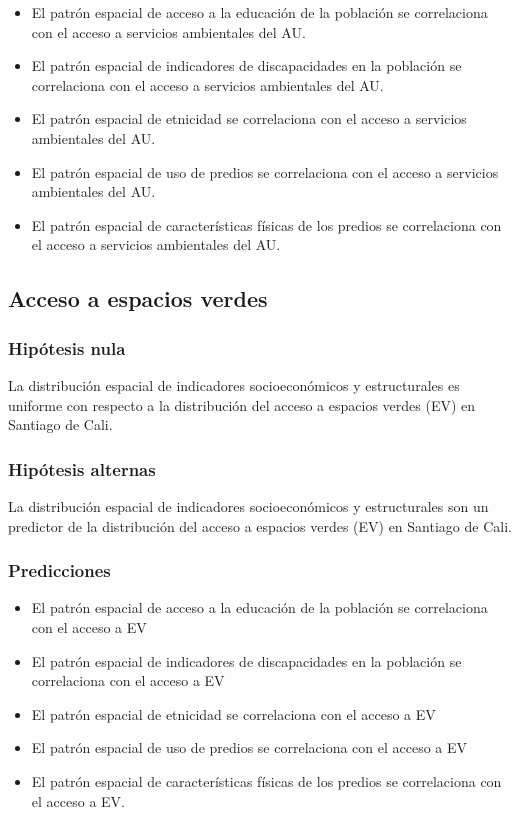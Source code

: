 \documentclass[12pt,]{book}
\providecommand{\tightlist}{%
  \setlength{\itemsep}{0pt}\setlength{\parskip}{0pt}}
\begin{document}
\begin{itemize}
\tightlist
\item
  El patrón espacial de acceso a la educación de la población se
  correlaciona con el acceso a servicios ambientales del AU.
\item
  El patrón espacial de indicadores de discapacidades en la población se
  correlaciona con el acceso a servicios ambientales del AU.
\item
  El patrón espacial de etnicidad se correlaciona con el acceso a
  servicios ambientales del AU.
\item
  El patrón espacial de uso de predios se correlaciona con el acceso a
  servicios ambientales del AU.
\item
  El patrón espacial de características físicas de los predios se
  correlaciona con el acceso a servicios ambientales del AU.
\end{itemize}

\subsection{Acceso a espacios verdes}\label{acceso-a-espacios-verdes}

\subsubsection{Hipótesis nula}\label{hipotesis-nula-1}

La distribución espacial de indicadores socioeconómicos y estructurales
es uniforme con respecto a la distribución del acceso a espacios verdes
(EV) en Santiago de Cali.

\subsubsection{Hipótesis alternas}\label{hipotesis-alternas-1}

La distribución espacial de indicadores socioeconómicos y estructurales
son un predictor de la distribución del acceso a espacios verdes (EV) en
Santiago de Cali.

\subsubsection{Predicciones}\label{predicciones-1}

\begin{itemize}
\tightlist
\item
  El patrón espacial de acceso a la educación de la población se
  correlaciona con el acceso a EV
\item
  El patrón espacial de indicadores de discapacidades en la población se
  correlaciona con el acceso a EV
\item
  El patrón espacial de etnicidad se correlaciona con el acceso a EV
\item
  El patrón espacial de uso de predios se correlaciona con el acceso a
  EV
\item
  El patrón espacial de características físicas de los predios se
  correlaciona con el acceso a EV.
\end{itemize}
\end{document}
